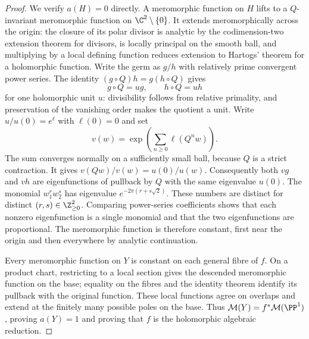 \begin{proof}
We verify $a(H)=0$ directly. A meromorphic function on $H$ lifts
to a $Q$-invariant meromorphic function on $\C^2\setminus\{0\}$.
It extends meromorphically across the origin: the closure of its
polar divisor is analytic by the codimension-two extension theorem
for divisors, is locally principal on the smooth ball, and
multiplying by a local defining function reduces extension to
Hartogs' theorem for a holomorphic function. Write the germ as
$g/h$ with relatively prime convergent power series. The identity
$(g\circ Q)h=g(h\circ Q)$ gives
\[
g\circ Q=ug,\qquad h\circ Q=uh
\]
for one holomorphic unit $u$: divisibility follows from relative
primality, and preservation of the vanishing order makes the
quotient a unit. Write $u/u(0)=e^\ell$ with $\ell(0)=0$ and set
\[
v(w)=\exp\left(\sum_{n\ge0}\ell(Q^nw)\right).
\]
The sum converges normally on a sufficiently small ball, because
$Q$ is a strict contraction. It gives
$v(Qw)/v(w)=u(0)/u(w)$. Consequently both $vg$ and $vh$ are
eigenfunctions of pullback by $Q$ with the same eigenvalue $u(0)$.
The monomial $w_1^rw_2^s$ has eigenvalue
$e^{-2\pi(r+s\sqrt2)}$. These numbers are distinct for distinct
$(r,s)\in\Z_{\ge0}^2$. Comparing power-series coefficients shows
that each nonzero eigenfunction is a single monomial and that the
two eigenfunctions are proportional. The meromorphic function is
therefore constant, first near the origin and then everywhere by
analytic continuation.

Every meromorphic function on $Y$ is constant on each general
fibre of $f$. On a product chart, restricting to a local section
gives the descended meromorphic function on the base; equality on
the fibres and the identity theorem identify its pullback with
the original function. These local functions agree on overlaps
and extend at the finitely many possible poles on the base.
Thus $\mathcal M(Y)=f^*\mathcal M(\PP^1)$, proving $a(Y)=1$
and proving that $f$ is the holomorphic algebraic reduction.


\end{proof}
